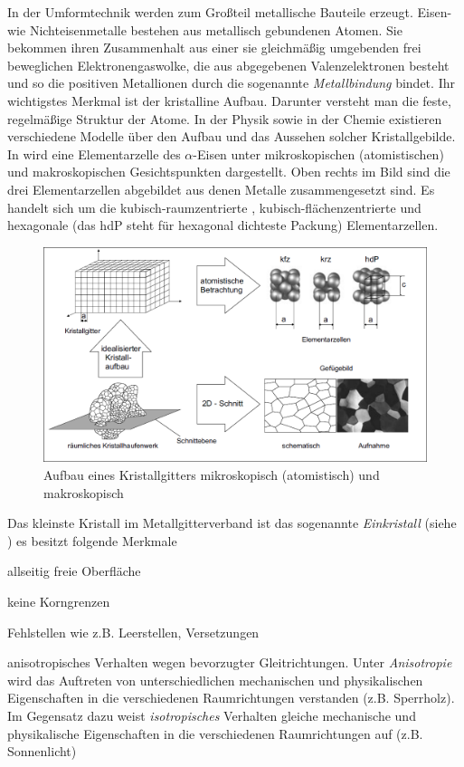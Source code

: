 \documentclass[12pt,a4paper,parskip,twoside,BCOR5mm,headsepline]{scrartcl}
\begin{document}
\begin{description*}
{In der Umformtechnik werden zum Großteil metallische Bauteile erzeugt. Eisen- wie Nichteisenmetalle bestehen aus metallisch gebundenen Atomen. Sie bekommen ihren Zusammenhalt aus einer sie gleichmäßig umgebenden frei beweglichen Elektronengaswolke, die aus abgegebenen Valenzelektronen besteht und so die positiven Metallionen  durch die sogenannte \emph{Metallbindung} bindet.\autocite[12]{wki} Ihr wichtigstes Merkmal ist der kristalline Aufbau. Darunter versteht man die feste, regelmäßige Struktur der Atome. In der Physik sowie in der Chemie existieren verschiedene Modelle über den Aufbau und das Aussehen solcher Kristallgebilde. In  wird eine Elementarzelle des $\alpha $-Eisen unter mikroskopischen (atomistischen) und makroskopischen Gesichtspunkten dargestellt. Oben rechts im Bild sind die drei Elementarzellen abgebildet aus denen Metalle zusammengesetzt sind. Es handelt sich um die  kubisch-raumzentrierte , kubisch-flächenzentrierte und hexagonale (das hdP steht für hexagonal dichteste Packung) Elementarzellen.\autocite[3-5]{fu}
\begin{figure}
\centering
\includegraphics[width=.8\textwidth]{makromikro}
\caption[Aufbau Kristallgitter]{Aufbau eines Kristallgitters mikroskopisch (atomistisch) und makroskopisch\autocite[4]{fu}}
\label{fig:makromikro}
\end{figure}


Das kleinste Kristall im Metallgitterverband ist das sogenannte \emph{Einkristall} (siehe ) es besitzt folgende Merkmale




\begin{itemize*}
\item allseitig freie Oberfläche
\item keine Korngrenzen
\item Fehlstellen wie z.B. Leerstellen, Versetzungen
\item anisotropisches Verhalten wegen bevorzugter Gleitrichtungen. Unter \emph{Anisotropie} wird das Auftreten von unterschiedlichen mechanischen und physikalischen Eigenschaften in die verschiedenen Raumrichtungen verstanden (z.B. Sperrholz). Im Gegensatz dazu weist \emph{isotropisches} Verhalten gleiche mechanische und physikalische Eigenschaften in die verschiedenen Raumrichtungen auf (z.B. Sonnenlicht)\autocite[37]{hu}



\end{itemize*}}
\end{description*}
\end{document}

